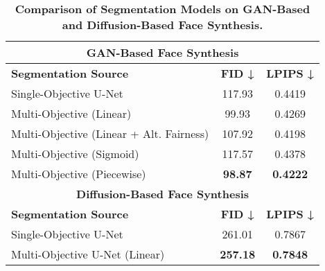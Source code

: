 \begin{table}[ht]
    \centering
    \caption{\textbf{Comparison of Segmentation Models on GAN-Based and Diffusion-Based Face Synthesis.}}
    \label{tab:synthesis_results}
    \begin{adjustbox}{max width=\textwidth}
    \begin{tabular}{lcc}
    \toprule
    \multicolumn{3}{c}{\textbf{GAN-Based Face Synthesis}} \\
    \midrule
    \textbf{Segmentation Source} & \textbf{FID ↓} & \textbf{LPIPS ↓} \\ 
    \midrule
    Single-Objective U-Net       & 117.93  & 0.4419  \\
    Multi-Objective (Linear)      & 99.93   & 0.4269  \\
    Multi-Objective (Linear + Alt. Fairness)  & 107.92  & 0.4198  \\
    Multi-Objective (Sigmoid)     & 117.57  & 0.4378  \\
    Multi-Objective (Piecewise)   & \textbf{98.87}  & \textbf{0.4222}  \\
    \midrule
    \multicolumn{3}{c}{\textbf{Diffusion-Based Face Synthesis}} \\
    \midrule
    \textbf{Segmentation Source} & \textbf{FID ↓} & \textbf{LPIPS ↓} \\ 
    \midrule
    Single-Objective U-Net      & 261.01  & 0.7867  \\
    Multi-Objective U-Net (Linear)      & \textbf{257.18}  & \textbf{0.7848}  \\
    \bottomrule
    \end{tabular}
    \end{adjustbox}
\end{table}




